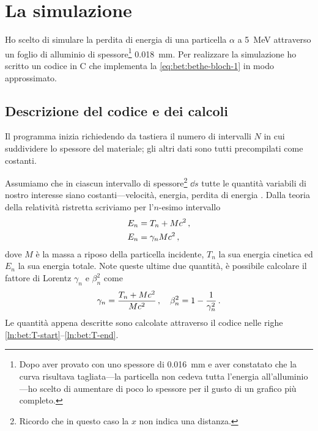 \section{La simulazione}
    Ho scelto di simulare la perdita di energia di una particella $\alpha$ a \SI{5}{\mega\eV} attraverso un foglio di alluminio di spessore\footnote{Dopo aver provato con uno spessore di \SI{0.016}{\milli\meter} e aver constatato che la curva risultava tagliata---la particella non cedeva tutta l'energia all'alluminio---ho scelto di aumentare di poco lo spessore per il gusto di un grafico più completo.} \SI{0.018}{\milli\meter}. Per realizzare la simulazione ho scritto un codice in C che implementa la \eqref{eq:bet:bethe-bloch-1} in modo approssimato.
    \subsection{Descrizione del codice e dei calcoli}
        Il programma inizia richiedendo da tastiera il numero di intervalli $N$ in cui suddividere lo spessore del materiale; gli altri dati sono tutti precompilati come costanti. 
        
        Assumiamo che in ciascun intervallo di spessore\footnote{Ricordo che in questo caso la $x$ non indica una distanza.} $\dd{s}$ tutte le quantità variabili di nostro interesse siano costanti---velocità, energia, perdita di energia \myetc. Dalla teoria della relatività ristretta scriviamo per l'$n$-esimo intervallo
        \begin{align*}   
                E_n &= T_n + M c^2 \,, \\
                E_n &= \gamma_n M c^2 \,,
        \end{align*}
        dove $M$ è la massa a riposo della particella incidente, $T_n$ la sua energia cinetica ed $E_n$ la sua energia totale. Note queste ultime due quantità, è possibile calcolare il fattore di Lorentz $\gamma_n$ e $\beta_n^2$ come
        \begin{equation*}
            \gamma_n = \frac{T_n + M c^2}{M c^2}
            \,,
            \quad
            \beta_n^2 = 1 - \frac{1}{\gamma_n^2}
            \,.
        \end{equation*}
        Le quantità appena descritte sono calcolate attraverso il codice nelle righe \ref{ln:bet:T-start}--\ref{ln:bet:T-end}.

